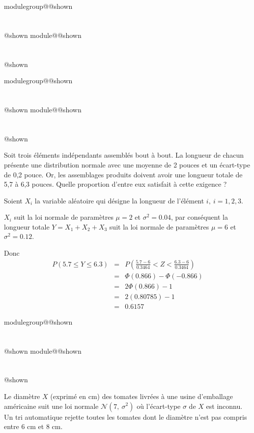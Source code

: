 \documentclass{Evaluation}
\makeatletter
\newcommand{\currentmodulekey}{}
\newcommand{\currentmoduletitle}{}
\newcommand{\currentgroupkey}{}
\newcommand{\currentgrouptitle}{}
\newcommand{\showmoduleifneeded}{%
  \ifx\currentgroupkey\empty\else
    \expandafter\ifx\csname modulegroup@\currentgroupkey @shown\endcsname\relax
      \section*{\currentgrouptitle}%
      \expandafter\gdef\csname modulegroup@\currentgroupkey @shown\endcsname{1}%
    \fi
  \fi
  \expandafter\ifx\csname module@\currentmodulekey @shown\endcsname\relax
    \section*{\currentmoduletitle}%
    \expandafter\gdef\csname module@\currentmodulekey @shown\endcsname{1}%
  \fi
}
\newenvironment{A24}{\showmoduleifneeded}{}
\newenvironment{H25}{\showmoduleifneeded}{}
\makeatother
\begin{document}
\begin{questions}
\begin{A24}
\end{A24}

\begin{A24}
\question {} %
Soit trois éléments indépendants assemblés bout à bout. La longueur de chacun présente une 
distribution normale avec une moyenne de 2 pouces et un écart-type de 0,2 pouce. Or, les assemblages produits doivent avoir une longueur totale de 5,7 à 6,3 pouces. Quelle proportion d’entre eux satisfait à cette exigence ?

\begin{solution}
    Soient $X_i$ la variable aléatoire qui désigne la longueur de l'élément $i,\ i=1, 2, 3$.

    $X_i$ suit la loi normale de paramètres $\mu =2$ et $\sigma^2 =0.04$, par conséquent la longueur totale $Y=X_1+X_2+X_3$ suit la loi normale de paramètres $\mu =6$ et $\sigma^2 =0.12$.

 Donc
 $$
 \begin{array}{ccl}
     P(5.7\leq Y \leq 6.3) &=& P(\frac{5.7-6}{0.3464} < Z<\frac{6.3-6}{0.3464})  \\
      &=& \Phi(0.866) -  \Phi(-0.866) \\
      &=& 2 \Phi(0.866) -1 \\
      &=& 2(0.80785) -1 \\
      &=& 0.6157
 \end{array}
 $$
 \end{solution}
\end{A24}

\begin{H25}
\question {} %
Le diamètre $X$ (exprimé en cm) des tomates livrées à une usine d'emballage
américaine suit une loi normale $\mathcal{N}(7,\ \sigma^2)$ où l'écart-type $\sigma$ de $X$ est inconnu. Un tri automatique rejette
toutes les tomates dont le diamètre n'est pas compris entre 6 cm et 8 cm.
\begin{parts}

\end{parts}
\end{H25}
\end{questions}
\end{document}
